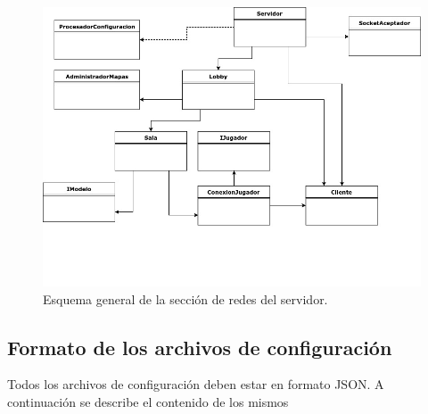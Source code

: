 \documentclass[titlepage,a4paper,12pt]{article}
\begin{document}
\begin{figure}[H]
	\centering
	\includegraphics[width=16cm]{../imagenes/esquema-uml-servidor.jpg}
	\caption{\label{fig:esquema-uml-servidor} Esquema general de la sección de redes del servidor.}
\end{figure}


\subsection{Formato de los archivos de configuración}

Todos los archivos de configuración deben estar en formato JSON. A continuación se describe el contenido de los mismos
\end{document}

